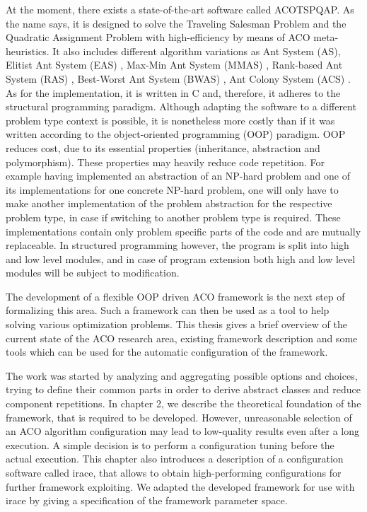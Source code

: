 \documentclass[12pt,a4paper,oneside]{book}
\begin{document}
At the moment, there exists a state-of-the-art software called ACOTSPQAP. As the name says, it is designed to solve the Traveling Salesman Problem and the Quadratic Assignment Problem with high-efficiency by means of ACO meta-heuristics. It also includes different algorithm variations as Ant System (AS), Elitist Ant System (EAS) \cite{Dor1992:thesis,Dorigo1996}, Max-Min Ant System (MMAS) \cite{STUTZLE2000889}, Rank-based Ant System (RAS) \cite{Bullnheimer97anew}, Best-Worst Ant System (BWAS) \cite{Cordon00anew}, Ant Colony System (ACS) \cite{Dorigo1997}. As for the implementation, it is written in C and, therefore, it adheres to the structural programming paradigm. Although adapting the software to a different problem type context is possible, it is nonetheless more costly than if it was written according to the object-oriented programming (OOP) paradigm. OOP reduces cost, due to its essential properties (inheritance, abstraction and polymorphism). These properties may heavily reduce code repetition. For example having implemented an abstraction of an NP-hard problem and one of its implementations for one concrete NP-hard problem, one will only have to make another implementation of the problem abstraction for the respective problem type, in case if switching to another problem type is required. These implementations contain only problem specific parts of the code and are mutually replaceable. In structured programming however, the program is split into high and low level modules, and in case of program extension both high and low level modules will be subject to modification.

The development of a flexible OOP driven ACO framework is the next step of formalizing this area. Such a framework can then be used as a tool to help solving various optimization problems. This thesis gives a brief overview of the current state of the ACO research area, existing framework description and some tools which can be used for the automatic configuration of the framework.

The work was started by analyzing and aggregating possible options and choices, trying to define their common parts in order to derive abstract classes and reduce component repetitions. In chapter 2, we describe the theoretical foundation of the framework, that is required to be developed. However, unreasonable selection of an ACO algorithm configuration may lead to low-quality results even after a long execution. A simple decision is to perform a configuration tuning before the actual execution. This chapter also introduces a description of a configuration software called irace, that allows to obtain high-performing configurations for further framework exploiting. We adapted the developed framework for use with irace by giving a specification of the framework parameter space.
\end{document}
